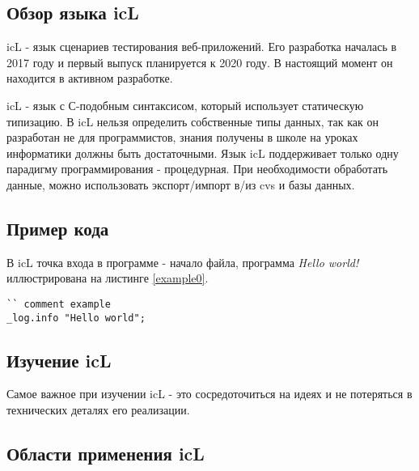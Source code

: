 \documentclass[a4paper, 14pt]{extarticle}
\begin{document}
	\subsection{Обзор языка icL}
	
	icL - язык сценариев тестирования веб-приложений. Его разработка началась в 2017 году и первый выпуск планируется к 2020 году. В настоящий момент он находится в активном разработке.
	
	icL - язык с С-подобным синтаксисом, который использует статическую типизацию. В icL нельзя определить собственные типы данных, так как он разработан не для программистов, знания получены в школе на уроках информатики должны быть достаточными. Язык icL поддерживает только одну парадигму программирования - процедурная. При необходимости обработать данные, можно использовать экспорт/импорт в/из cvs и базы данных.
	
	\subsection{Пример кода}

	В icL точка входа в программе - начало файла, программа \textit{Hello world!} иллюстрирована на листинге \ref{example0}.
	
	\begin{lstlisting}[caption=Пример, label=example0]
`` comment example
_log.info "Hello world";
	\end{lstlisting}
  
	\subsection{Изучение icL}
	
	Самое важное при изучении icL - это сосредоточиться на идеях и не потеряться в технических деталях его реализации.
	
	\subsection{Области применения icL}
	
\end{document}
